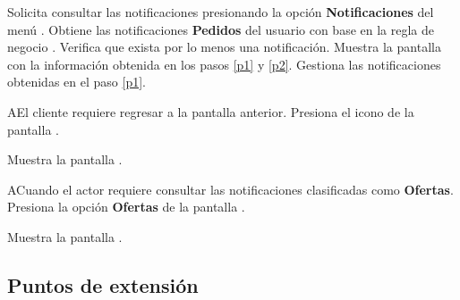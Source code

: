 	
	\begin{UCtrayectoria}
		\UCpaso[\UCactor] Solicita consultar las notificaciones presionando la opción  \bellIcon \textbf{Notificaciones} del menú .
		\UCpaso \label{p1} Obtiene las notificaciones \textbf{Pedidos} del usuario con base en la regla de negocio . 
		\UCpaso Verifica que exista por lo menos una notificación.
		\UCpaso Muestra la pantalla  con la información obtenida en los pasos \ref{p1} y \ref{p2}.
		\UCpaso \label{Getiona} Gestiona las notificaciones obtenidas en el paso \ref{p1}.  
	\end{UCtrayectoria}
	
	\begin{UCtrayectoriaA}{A}{El cliente requiere regresar a la pantalla anterior.}
		\UCpaso Presiona el icono \regresarIcon de la pantalla .
		
		\UCpaso Muestra la pantalla .
	
	\end{UCtrayectoriaA}
	

	\begin{UCtrayectoriaA}{A}{Cuando el actor requiere consultar las notificaciones clasificadas como \textbf{Ofertas}.}
		\UCpaso Presiona la opción \textbf{Ofertas} de la pantalla .
		
		\UCpaso Muestra la pantalla .
	
	\end{UCtrayectoriaA}
	
\subsection{Puntos de extensión}


	
